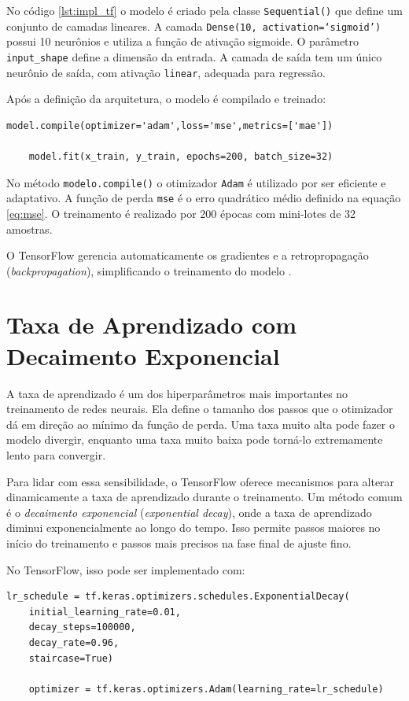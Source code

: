 \documentclass[12pt,a4paper,oneside]{report}
\begin{document}
No código \ref{lst:impl_tf} o modelo é criado pela classe \texttt{Sequential()} que define um conjunto de camadas lineares. A camada \texttt{Dense(10, activation=`sigmoid')} possui 10 neurônios e utiliza a função de ativação sigmoide. O parâmetro \texttt{input\_shape} define a dimensão da entrada. A camada de saída tem um único neurônio de saída, com ativação \texttt{linear}, adequada para regressão. 

Após a definição da arquitetura, o modelo é compilado e treinado:

\begin{lstlisting}[caption={Compilar e Treinar o Modelo}, label={lst:compl_tf}]
	model.compile(optimizer='adam',loss='mse',metrics=['mae'])
	
	model.fit(x_train, y_train, epochs=200, batch_size=32)
\end{lstlisting}

No método \texttt{modelo.compile()} o otimizador \texttt{Adam} é utilizado por ser eficiente e adaptativo. A função de perda \texttt{mse} é o erro quadrático médio definido na equação \ref{eq:mse}. O treinamento é realizado por 200 épocas com mini-lotes de 32 amostras.

O TensorFlow gerencia automaticamente os gradientes e a retropropagação (\textit{backpropagation}), simplificando o treinamento do modelo \cite{geeksforgeeks:2025, leite:2018aug}.

\section{Taxa de Aprendizado com Decaimento Exponencial}

A taxa de aprendizado é um dos hiperparâmetros mais importantes no treinamento de redes neurais. Ela define o tamanho dos passos que o otimizador dá em direção ao mínimo da função de perda. Uma taxa muito alta pode fazer o modelo divergir, enquanto uma taxa muito baixa pode torná-lo extremamente lento para convergir.

Para lidar com essa sensibilidade, o TensorFlow oferece mecanismos para alterar dinamicamente a taxa de aprendizado durante o treinamento. Um método comum é o \textit{decaimento exponencial} (\textit{exponential decay}), onde a taxa de aprendizado diminui exponencialmente ao longo do tempo. Isso permite passos maiores no início do treinamento e passos mais precisos na fase final de ajuste fino.

No TensorFlow, isso pode ser implementado com:
\begin{lstlisting}[caption={Decaimento exponencial}, label={lst:exp_dacay}]
	lr_schedule = tf.keras.optimizers.schedules.ExponentialDecay(
	initial_learning_rate=0.01,
	decay_steps=100000,
	decay_rate=0.96,
	staircase=True)
	
	optimizer = tf.keras.optimizers.Adam(learning_rate=lr_schedule)
\end{lstlisting}
\end{document}
